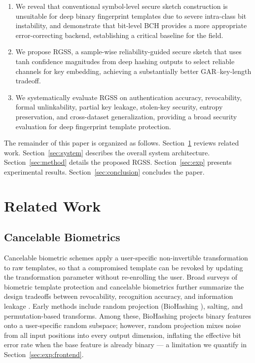 \documentclass[journal]{IEEEtran}
\begin{document}
\begin{enumerate}
  \item We reveal that conventional symbol-level secure sketch
  construction is unsuitable for deep binary fingerprint templates
  due to severe intra-class bit instability, and demonstrate that
  bit-level BCH provides a more appropriate error-correcting backend,
  establishing a critical baseline for the field.

  \item We propose RGSS, a sample-wise reliability-guided secure
  sketch that uses tanh confidence magnitudes from deep hashing
  outputs to select reliable channels for key embedding, achieving
  a substantially better GAR--key-length tradeoff.

  \item We systematically evaluate RGSS on authentication accuracy,
  revocability, formal unlinkability, partial key leakage, stolen-key
  security, entropy preservation, and cross-dataset generalization,
  providing a broad security evaluation for deep fingerprint
  template protection.
\end{enumerate}

The remainder of this paper is organized as follows.
Section~\ref{sec:related} reviews related work.
Section~\ref{sec:system} describes the overall system architecture.
Section~\ref{sec:method} details the proposed RGSS.
Section~\ref{sec:exp} presents experimental results.
Section~\ref{sec:conclusion} concludes the paper.

\section{Related Work}
\label{sec:related}

\subsection{Cancelable Biometrics}

Cancelable biometric schemes \cite{ratha2001enhancing,patel2015cancelable}
apply a user-specific non-invertible transformation to raw templates,
so that a compromised template can be revoked by updating the
transformation parameter without re-enrolling the user.
Broad surveys of biometric template protection and cancelable
biometrics further summarize the design tradeoffs between
revocability, recognition accuracy, and information leakage
\cite{rathgeb2011survey}.
Early methods include random projection (BioHashing
\cite{teoh2004biohashing,kong2006biohashing}), salting, and
permutation-based transforms.
Among these, BioHashing projects binary features onto a user-specific
random subspace; however, random projection mixes noise from all
input positions into every output dimension, inflating the effective
bit error rate when the base feature is already binary — a limitation
we quantify in Section~\ref{sec:exp:frontend}.
\end{document}

